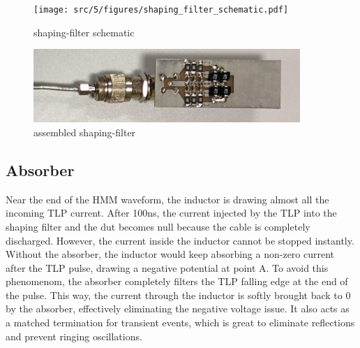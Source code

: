 \begin{figure}[!h]
  \centering
  \texttt{[image: src/5/figures/shaping\_filter\_schematic.pdf]}
  \caption{shaping-filter schematic}
  \label{fig:shaping_filter_schematic}
\end{figure}

\begin{figure}[!h]
  \centering
  \includegraphics[width=0.9\textwidth]{src/5/figures/filter.jpg}
  \caption{assembled shaping-filter}
  \label{pic:shaping_filter_assembled}
\end{figure}


\subsection{Absorber}

Near the end of the HMM waveform, the inductor is drawing almost all the incoming \gls{TLP} current.
After 100ns, the current injected by the TLP into the shaping filter and the \gls{dut} becomes null because the cable is completely discharged.
However, the current inside the inductor cannot be stopped instantly.
Without the absorber, the inductor would keep absorbing a non-zero current after the TLP pulse, drawing a negative potential at point A.
To avoid this phenomenom, the absorber completely filters the TLP falling edge at the end of the pulse.
This way, the current through the inductor is softly brought back to 0 by the absorber, effectively eliminating the negative voltage issue.
It also acts as a matched termination for transient events, which is great to eliminate reflections and prevent ringing oscillations.

